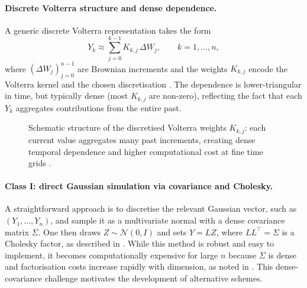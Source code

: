 \documentclass[12pt,a4paper]{article}
\theoremstyle{definition}
\theoremstyle{plain}
\theoremstyle{remark}
\theoremstyle{plain}
\begin{document}
\paragraph{Discrete Volterra structure and dense dependence.}
A generic discrete Volterra representation takes the form
\begin{equation}
\label{eq:volterra_discrete_generic}
Y_k \approx \sum_{j=0}^{k-1} K_{k,j}\,\Delta W_j,
\qquad
k=1,\dots,n,
\end{equation}
where $(\Delta W_j)_{j=0}^{n-1}$ are Brownian increments and the weights $K_{k,j}$ encode the Volterra kernel and the chosen discretisation \cite{BayerFriz2016}. The dependence is lower-triangular in time, but typically dense (most $K_{k,j}$ are non-zero), reflecting the fact that each $Y_k$ aggregates contributions from the entire past.

\begin{figure}[t]
\centering
{}
\caption{Schematic structure of the discretised Volterra weights $K_{k,j}$: each current value aggregates many past increments, creating dense temporal dependence and higher computational cost at fine time grids \cite{BayerFriz2016}.}
\label{fig:volterra_weights_structure}
\end{figure}
\FloatBarrier

\paragraph{Class I: direct Gaussian simulation via covariance and Cholesky.}
A straightforward approach is to discretise the relevant Gaussian vector, such as $(Y_1,\dots,Y_n)$, and sample it as a multivariate normal with a dense covariance matrix $\Sigma$. One then draws $Z\sim\mathcal{N}(0,I)$ and sets $Y=LZ$, where $LL^\top=\Sigma$ is a Cholesky factor, as described in \cite{BayerFriz2016}. While this method is robust and easy to implement, it becomes computationally expensive for large $n$ because $\Sigma$ is dense and factorisation costs increase rapidly with dimension, as noted in \cite{BayerFriz2016}. This dense-covariance challenge motivates the development of alternative schemes.
\end{document}

